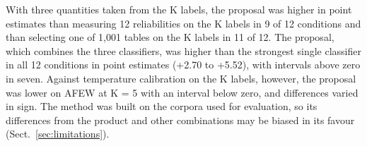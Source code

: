 With three quantities taken from the K labels, the proposal was higher in point estimates than measuring 12 reliabilities on the K labels in 9 of 12 conditions and than selecting one of 1,001 tables on the K labels in 11 of 12. The proposal, which combines the three classifiers, was higher than the strongest single classifier in all 12 conditions in point estimates (+2.70 to +5.52\pt), with intervals above zero in seven. Against temperature calibration on the K labels, however, the proposal was lower on AFEW at K = 5 with an interval below zero, and differences varied in sign. The method was built on the corpora used for evaluation, so its differences from the product and other combinations may be biased in its favour (Sect.~\ref{sec:limitations}).
